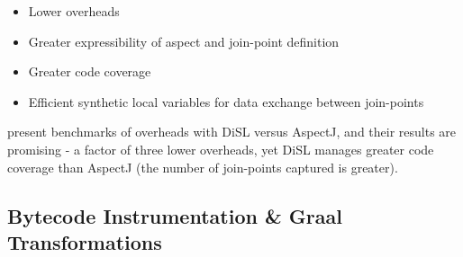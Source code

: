 	\begin{itemize}
		\item Lower overheads
		\item Greater expressibility of aspect and join-point definition
		\item Greater code coverage
		\item Efficient synthetic local variables for data exchange between join-points
	\end{itemize}
	
	\citeauthor{Marek2012} present benchmarks of overheads with DiSL versus AspectJ, and their results are promising - a factor of three lower overheads, yet DiSL manages greater code coverage than AspectJ (the number of join-points captured is greater).
	
	\subsection{Bytecode Instrumentation \& Graal Transformations} \label{sec:instrumentation/hybrid/graalbytecode}